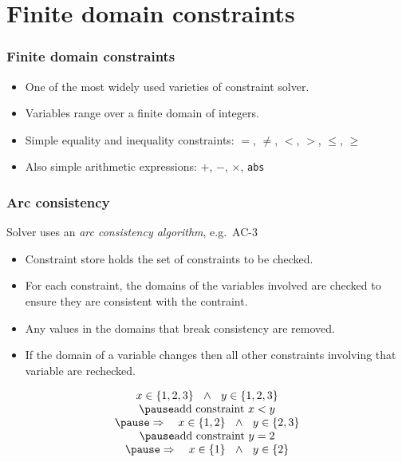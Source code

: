 \documentclass[aspectratio=169,hyphens]{beamer} %
\begin{document}
\section{Finite domain constraints}

\begin{frame}[fragile]
    \frametitle{Finite domain constraints}
\begin{itemize}
    \item One of the most widely used varieties of constraint solver.
        \pause
    \item Variables range over a finite domain of integers.
        \pause
    \item Simple equality and inequality constraints: $=$, $\neq$, $<$, $>$, $\leq$, $\geq$
        \pause
    \item Also simple arithmetic expressions: $+$, $-$, $\times$, \texttt{abs}
\end{itemize}
\end{frame}

\begin{frame}[fragile]
    \frametitle{Arc consistency}
Solver uses an \emph{arc consistency algorithm}, e.g.\ AC-3
\begin{itemize}
    \item Constraint store holds the set of constraints to be checked.
        \pause
    \item For each constraint, the domains of the variables involved are checked to
        ensure they are consistent with the contraint.
        \pause
    \item Any values in the domains that break consistency are removed.
        \pause
    \item If the domain of a variable changes then all other constraints involving that variable are
        rechecked.
\end{itemize}
\pause
\begin{example}
\begin{displaymath}
    \begin{array}{c}
    x \in \{1, 2, 3\} ~~\land~~ y \in \{1, 2, 3\} \\
    \pause
    \textrm{add constraint~} x < y \\
    \pause
    \Rightarrow ~~~ x \in \{1, 2\} ~~\land~~ y \in \{2, 3\} \\
    \pause
    \textrm{add constraint~} y = 2 \\
    \pause
        \Rightarrow ~~~ x \in \{1\} ~~\land~~ y \in \{2\}
    \end{array}
\end{displaymath}
\end{example}
\end{frame}
\end{document}

